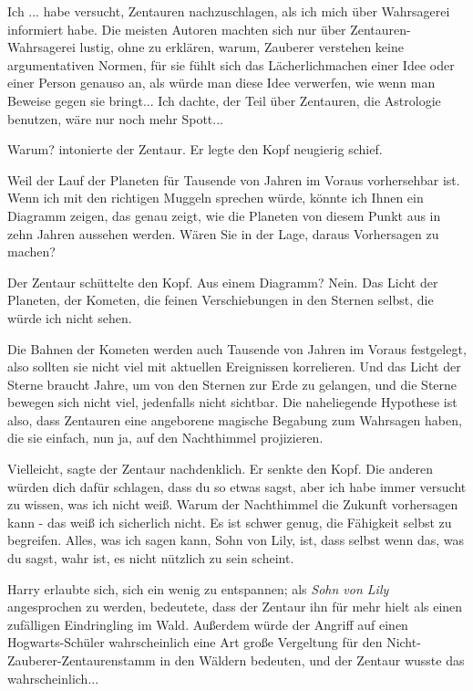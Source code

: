 \glqq{}Ich ... habe versucht, Zentauren nachzuschlagen, als ich mich über
Wahrsagerei informiert habe. Die meisten Autoren machten sich nur über
Zentauren-Wahrsagerei lustig, ohne zu erklären, warum, Zauberer verstehen keine
argumentativen Normen, für sie fühlt sich das Lächerlichmachen einer Idee oder
einer Person genauso an, als würde man diese Idee verwerfen, wie wenn man
Beweise gegen sie bringt... Ich dachte, der Teil über Zentauren, die Astrologie
benutzen, wäre nur noch mehr Spott...\grqq{}

\glqq{}Warum?\grqq{} intonierte der Zentaur. Er legte den Kopf neugierig schief.

\glqq{}Weil der Lauf der Planeten für Tausende von Jahren im Voraus vorhersehbar
ist. Wenn ich mit den richtigen Muggeln sprechen würde, könnte ich Ihnen ein
Diagramm zeigen, das genau zeigt, wie die Planeten von diesem Punkt aus in zehn
Jahren aussehen werden. Wären Sie in der Lage, daraus Vorhersagen zu machen?\grqq{}

Der Zentaur schüttelte den Kopf. \glqq{}Aus einem Diagramm? Nein. Das Licht der
Planeten, der Kometen, die feinen Verschiebungen in den Sternen selbst, die
würde ich nicht sehen.\grqq{}

\glqq{}Die Bahnen der Kometen werden auch Tausende von Jahren im Voraus
festgelegt, also sollten sie nicht viel mit aktuellen Ereignissen korrelieren.
Und das Licht der Sterne braucht Jahre, um von den Sternen zur Erde zu gelangen,
und die Sterne bewegen sich nicht viel, jedenfalls nicht sichtbar. Die
naheliegende Hypothese ist also, dass Zentauren eine angeborene magische
Begabung zum Wahrsagen haben, die sie einfach, nun ja, auf den Nachthimmel
projizieren.\grqq{}

\glqq{}Vielleicht\grqq{}, sagte der Zentaur nachdenklich. Er senkte den Kopf.
\glqq{}Die anderen würden dich dafür schlagen, dass du so etwas sagst, aber ich
habe immer versucht zu wissen, was ich nicht weiß. Warum der Nachthimmel die
Zukunft vorhersagen kann - das weiß ich sicherlich nicht. Es ist schwer genug,
die Fähigkeit selbst zu begreifen. Alles, was ich sagen kann, Sohn von Lily,
ist, dass selbst wenn das, was du sagst, wahr ist, es nicht nützlich zu sein
scheint.\grqq{}

Harry erlaubte sich, sich ein wenig zu entspannen; als\emph{ \glqq{}Sohn von
Lily\grqq{}} angesprochen zu werden, bedeutete, dass der Zentaur ihn für mehr
hielt als einen zufälligen Eindringling im Wald. Außerdem würde der Angriff auf
einen Hogwarts-Schüler wahrscheinlich eine Art große Vergeltung für den
Nicht-Zauberer-Zentaurenstamm in den Wäldern bedeuten, und der Zentaur wusste
das wahrscheinlich...

